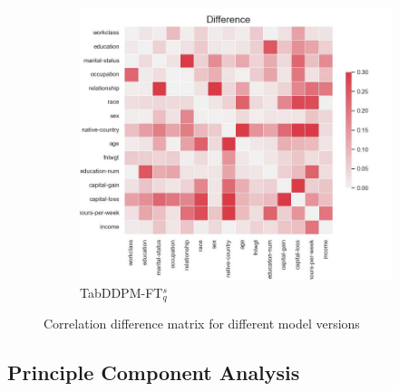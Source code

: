 \begin{figure}[h]
\begin{subfigure}{0.3\textwidth}
    \end{subfigure}
	\begin{subfigure}{0.3\textwidth}
		\includegraphics[width=\textwidth]{images/correlation_difference/tab-ddpm-ft-simTune.jpg}
		\caption{TabDDPM-FT$^{s}_q$}
    \end{subfigure}
    \caption{Correlation difference matrix for different model versions}
	\label{fig_a:corr_diff}
\end{figure}

\subsection[]{Principle Component Analysis}
\label{A:pca}

